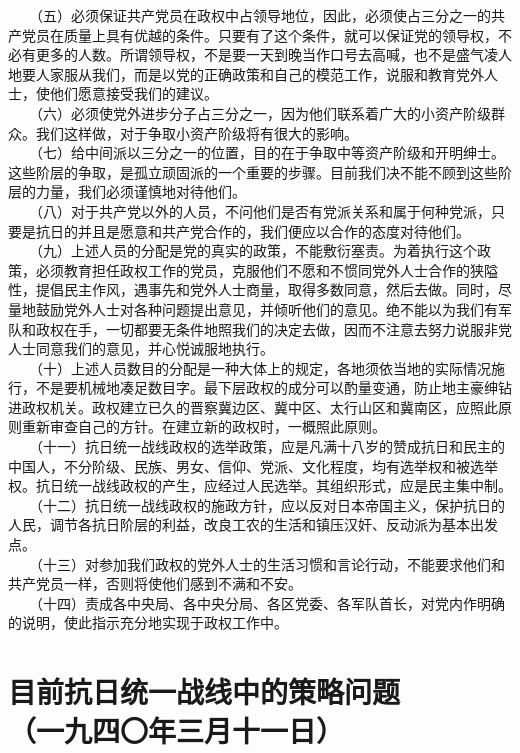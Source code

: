\documentclass[cn,11pt,chinese]{elegantbook}
\def\myformat#1{\hfil\hfil #1}
\begin{document}
　　（五）必须保证共产党员在政权中占领导地位，因此，必须使占三分之一的共产党员在质量上具有优越的条件。只要有了这个条件，就可以保证党的领导权，不必有更多的人数。所谓领导权，不是要一天到晚当作口号去高喊，也不是盛气凌人地要人家服从我们，而是以党的正确政策和自己的模范工作，说服和教育党外人士，使他们愿意接受我们的建议。\\
　　（六）必须使党外进步分子占三分之一，因为他们联系着广大的小资产阶级群众。我们这样做，对于争取小资产阶级将有很大的影响。\\
　　（七）给中间派以三分之一的位置，目的在于争取中等资产阶级和开明绅士。这些阶层的争取，是孤立顽固派的一个重要的步骤。目前我们决不能不顾到这些阶层的力量，我们必须谨慎地对待他们。\\
　　（八）对于共产党以外的人员，不问他们是否有党派关系和属于何种党派，只要是抗日的并且是愿意和共产党合作的，我们便应以合作的态度对待他们。\\
　　（九）上述人员的分配是党的真实的政策，不能敷衍塞责。为着执行这个政策，必须教育担任政权工作的党员，克服他们不愿和不惯同党外人士合作的狭隘性，提倡民主作风，遇事先和党外人士商量，取得多数同意，然后去做。同时，尽量地鼓励党外人士对各种问题提出意见，并倾听他们的意见。绝不能以为我们有军队和政权在手，一切都要无条件地照我们的决定去做，因而不注意去努力说服非党人士同意我们的意见，并心悦诚服地执行。\\
　　（十）上述人员数目的分配是一种大体上的规定，各地须依当地的实际情况施行，不是要机械地凑足数目字。最下层政权的成分可以酌量变通，防止地主豪绅钻进政权机关。政权建立已久的晋察冀边区、冀中区、太行山区和冀南区，应照此原则重新审查自己的方针。在建立新的政权时，一概照此原则。\\
　　（十一）抗日统一战线政权的选举政策，应是凡满十八岁的赞成抗日和民主的中国人，不分阶级、民族、男女、信仰、党派、文化程度，均有选举权和被选举权。抗日统一战线政权的产生，应经过人民选举。其组织形式，应是民主集中制。\\
　　（十二）抗日统一战线政权的施政方针，应以反对日本帝国主义，保护抗日的人民，调节各抗日阶层的利益，改良工农的生活和镇压汉奸、反动派为基本出发点。\\
　　（十三）对参加我们政权的党外人士的生活习惯和言论行动，不能要求他们和共产党员一样，否则将使他们感到不满和不安。\\
　　（十四）责成各中央局、各中央分局、各区党委、各军队首长，对党内作明确的说明，使此指示充分地实现于政权工作中。\\
\newpage\section*{\myformat{目前抗日统一战线中的策略问题}\\\myformat{（一九四〇年三月十一日）}}
\end{document}
